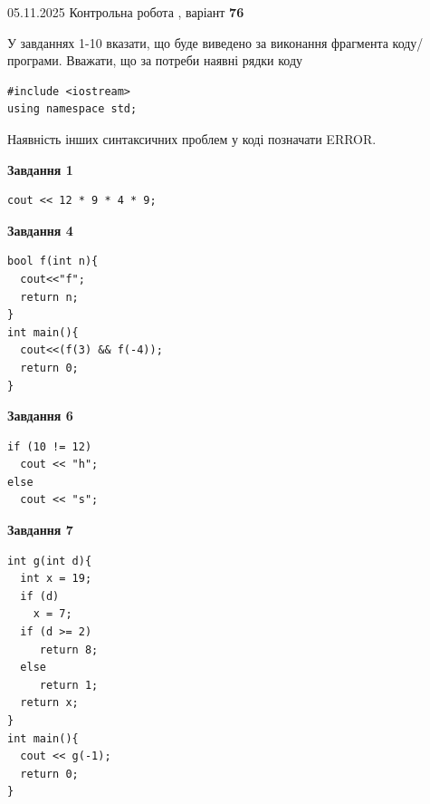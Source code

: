 \documentclass[12pt, ukrainian]{article}
\begin{document}
{\Large{05.11.2025 Контрольна робота , варіант  \No \textbf { 76 }\par}}
{
\begin {large}
У завданнях 1-10 вказати, що буде виведено за виконання фрагмента коду/про\-гра\-ми.
Вважати, що за потреби наявні рядки коду
\begin{verbatim}
#include <iostream>
using namespace std;
\end{verbatim}
Наявність інших синтаксичних проблем у коді позначати ERROR.

\begin{minipage}[t]{7.0cm}

\begin{center}
\textbf{Завдання 1}
\end{center}
\vspace{-8mm}

\begin{verbatim}
cout << 12 * 9 * 4 * 9;
\end{verbatim}



\begin{center}
\textbf{Завдання 4}
\end{center}
\vspace{-8mm}

\begin{verbatim}
bool f(int n){
  cout<<"f";
  return n;
}
int main(){
  cout<<(f(3) && f(-4));
  return 0;
}
\end{verbatim}



\begin{center}
\textbf{Завдання 6}
\end{center}
\vspace{-8mm}

\begin{verbatim}
if (10 != 12)
  cout << "h";
else
  cout << "s";
\end{verbatim}



\begin{center}
\textbf{Завдання 7}
\end{center}
\vspace{-8mm}

\begin{verbatim}
int g(int d){
  int x = 19;
  if (d)
    x = 7;
  if (d >= 2)
     return 8;
  else
     return 1;
  return x;
}
int main(){
  cout << g(-1);
  return 0;
}
\end{verbatim}


\end{minipage}
\end{large}}
\end{document}
